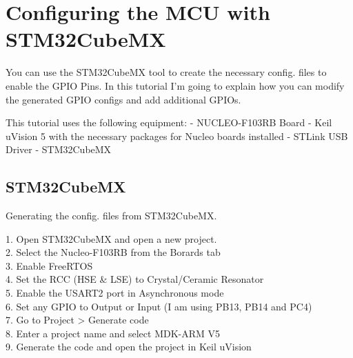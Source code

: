 \section{Configuring the MCU with STM32CubeMX}

You can use the STM32CubeMX tool to create the necessary config. files to enable the GPIO Pins. 
In this tutorial I’m going to explain how you can modify the generated GPIO configs and add additional 
GPIOs. 

This tutorial uses the following equipment: 
- NUCLEO-F103RB Board 
- Keil uVision 5 with the necessary packages for Nucleo boards installed 
- STLink USB Driver 
- STM32CubeMX 

\subsection{STM32CubeMX}

Generating the config. files from STM32CubeMX.  

1. Open STM32CubeMX and open a new project. \\
2. Select the Nucleo-F103RB from the Borards tab \\ 
3. Enable FreeRTOS \\
4. Set the RCC (HSE \& LSE) to Crystal/Ceramic Resonator \\
5. Enable the USART2 port in Asynchronous mode \\
6. Set any GPIO to Output or Input (I am using PB13, PB14 and PC4) \\
7. Go to Project > Generate code \\
8. Enter a project name and select MDK-ARM V5 \\
9. Generate the code and open the project in Keil uVision \\



